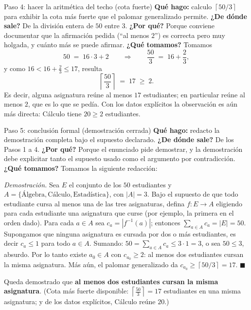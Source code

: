 \documentclass[11pt]{article}
\begin{document}
\begin{sol}
\begin{paso}{Paso 4: hacer la aritm\'etica del techo (cota fuerte)}
\textbf{Qu\'e hago:} calculo $\left\lceil 50/3\right\rceil$ para exhibir la cota m\'as fuerte que el palomar generalizado permite.
\textbf{¿De d\'onde sale?} De la divisi\'on entera de $50$ entre $3$.
\textbf{¿Por qu\'e?} Porque conviene documentar que la afirmaci\'on pedida (``al menos $2$'') es correcta pero muy holgada, y cu\'anto m\'as se puede afirmar.
\textbf{¿Qu\'e tomamos?} Tomamos
\[
50 \;=\; 16\cdot 3 + 2
\qquad\Longrightarrow\qquad
\frac{50}{3} \;=\; 16 + \frac{2}{3},
\]
y como $16 < 16+\tfrac{2}{3} \le 17$, resulta
\[
\left\lceil \frac{50}{3} \right\rceil \;=\; 17 \;\ge\; 2 .
\]
Es decir, alguna asignatura re\'une al menos $17$ estudiantes; en particular re\'une al menos $2$, que es lo que se ped\'ia. Con los datos expl\'icitos la observaci\'on es a\'un m\'as directa: C\'alculo tiene $20\ge 2$ estudiantes.
\end{paso}

\begin{paso}{Paso 5: conclusi\'on formal (demostraci\'on cerrada)}
\textbf{Qu\'e hago:} redacto la demostraci\'on completa bajo el supuesto declarado.
\textbf{¿De d\'onde sale?} De los Pasos 1 a 4.
\textbf{¿Por qu\'e?} Porque el enunciado pide demostrar, y la demostraci\'on debe explicitar tanto el supuesto usado como el argumento por contradicci\'on.
\textbf{¿Qu\'e tomamos?} Tomamos la siguiente redacci\'on:

\medskip
\emph{Demostraci\'on.} Sea $E$ el conjunto de los $50$ estudiantes y $A=\{\text{\'Algebra},\text{C\'alculo},\text{Estad\'istica}\}$, con $|A|=3$. Bajo el supuesto de que todo estudiante cursa al menos una de las tres asignaturas, defina $f:E\to A$ eligiendo para cada estudiante una asignatura que curse (por ejemplo, la primera en el orden dado). Para cada $a\in A$ sea $c_a=|f^{-1}(a)|$; entonces $\sum_{a\in A}c_a = |E| = 50$. Supongamos que ninguna asignatura es cursada por dos o m\'as estudiantes, es decir $c_a\le 1$ para todo $a\in A$. Sumando: $50 = \sum_{a\in A}c_a \le 3\cdot 1 = 3$, o sea $50\le 3$, absurdo. Por lo tanto existe $a_0\in A$ con $c_{a_0}\ge 2$: al menos dos estudiantes cursan la misma asignatura. M\'as a\'un, el palomar generalizado da $c_{a_0}\ge \left\lceil 50/3\right\rceil = 17$. $\blacksquare$
\end{paso}

\end{sol}

\begin{resp}
Queda demostrado que \textbf{al menos dos estudiantes cursan la misma asignatura}. (Cota m\'as fuerte disponible: $\left\lceil \frac{50}{3}\right\rceil = 17$ estudiantes en una misma asignatura; y de los datos expl\'icitos, C\'alculo re\'une $20$.)
\end{resp}
\end{document}

